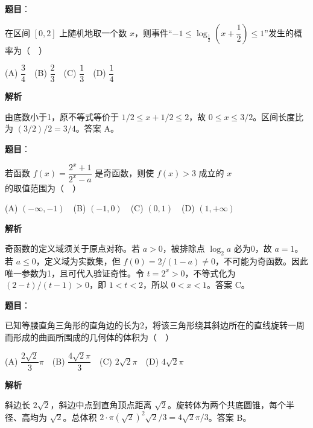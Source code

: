 \begin{answer}

\textbf{题目}：

在区间 \([0,2]\) 上随机地取一个数 \(x\)，则事件“\(-1\leqslant\log_{\frac12}\left(x+\dfrac12\right)\leqslant1\)”发生的概率为（　）

(A) \(\dfrac34\)　(B) \(\dfrac23\)　(C) \(\dfrac13\)　(D) \(\dfrac14\)

\textbf{解析}

由底数小于1，原不等式等价于 \(1/2\leqslant x+1/2\leqslant2\)，故 \(0\leqslant x\leqslant3/2\)。区间长度比为 \((3/2)/2=3/4\)。答案 A。


\end{answer}
\begin{answer}

\textbf{题目}：

若函数 \(f(x)=\dfrac{2^x+1}{2^x-a}\) 是奇函数，则使 \(f(x)>3\) 成立的 \(x\) 的取值范围为（　）

(A) \((-\infty,-1)\)　(B) \((-1,0)\)　(C) \((0,1)\)　(D) \((1,+\infty)\)

\textbf{解析}

奇函数的定义域须关于原点对称。若 \(a>0\)，被排除点 \(\log_2a\) 必为0，故 \(a=1\)。若 \(a\leqslant0\)，定义域为实数集，但 \(f(0)=2/(1-a)\ne0\)，不可能为奇函数。因此唯一参数为1，且可代入验证奇性。令 \(t=2^x>0\)，不等式化为 \((2-t)/(t-1)>0\)，即 \(1<t<2\)，所以 \(0<x<1\)。答案 C。


\end{answer}
\begin{answer}

\textbf{题目}：

已知等腰直角三角形的直角边的长为2，将该三角形绕其斜边所在的直线旋转一周而形成的曲面所围成的几何体的体积为（　）

(A) \(\dfrac{2\sqrt2}{3}\pi\)　(B) \(\dfrac{4\sqrt2\pi}{3}\)　(C) \(2\sqrt2\pi\)　(D) \(4\sqrt2\pi\)

\textbf{解析}

斜边长 \(2\sqrt2\)，斜边中点到直角顶点距离 \(\sqrt2\)。旋转体为两个共底圆锥，每个半径、高均为 \(\sqrt2\)。总体积 \(2\cdot\pi(\sqrt2)^2\sqrt2/3=4\sqrt2\pi/3\)。答案 B。


\end{answer}
